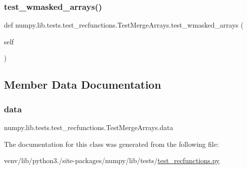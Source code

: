 \subsubsection{\texorpdfstring{test\+\_\+wmasked\+\_\+arrays()}{test\_wmasked\_arrays()}}
{\footnotesize\ttfamily def numpy.\+lib.\+tests.\+test\+\_\+recfunctions.\+Test\+Merge\+Arrays.\+test\+\_\+wmasked\+\_\+arrays (\begin{DoxyParamCaption}\item[{}]{self }\end{DoxyParamCaption})}



\subsection{Member Data Documentation}
\mbox{\label{classnumpy_1_1lib_1_1tests_1_1test__recfunctions_1_1TestMergeArrays_a02d55532308fc8b04646c33b0646a660}} 
\subsubsection{\texorpdfstring{data}{data}}
{\footnotesize\ttfamily numpy.\+lib.\+tests.\+test\+\_\+recfunctions.\+Test\+Merge\+Arrays.\+data}



The documentation for this class was generated from the following file\+:\begin{DoxyCompactItemize}
\item 
venv/lib/python3./site-\/packages/numpy/lib/tests/\hyperlink{test__recfunctions_8py}{test\+\_\+recfunctions.\+py}\end{DoxyCompactItemize}
